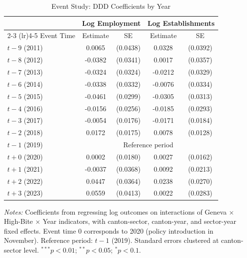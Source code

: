 \begin{table}[htbp]
\centering
\caption{Event Study: DDD Coefficients by Year}
\label{tab:event_study}
\begin{threeparttable}
\begin{tabular}{lcccc}
\toprule
 & \multicolumn{2}{c}{Log Employment} & \multicolumn{2}{c}{Log Establishments} \\
\cmidrule(lr){2-3} \cmidrule(lr){4-5}
Event Time & Estimate & SE & Estimate & SE \\
\midrule
$t-9$ (2011) & 0.0065 & (0.0438) & 0.0328 & (0.0392) \\
$t-8$ (2012) & -0.0382 & (0.0341) & 0.0017 & (0.0357) \\
$t-7$ (2013) & -0.0324 & (0.0324) & -0.0212 & (0.0329) \\
$t-6$ (2014) & -0.0338 & (0.0332) & -0.0076 & (0.0334) \\
$t-5$ (2015) & -0.0461 & (0.0299) & -0.0305 & (0.0313) \\
$t-4$ (2016) & -0.0156 & (0.0256) & -0.0185 & (0.0293) \\
$t-3$ (2017) & -0.0054 & (0.0176) & -0.0171 & (0.0184) \\
$t-2$ (2018) & 0.0172 & (0.0175) & 0.0078 & (0.0128) \\
$t-1$ (2019) & \multicolumn{4}{c}{Reference period} \\
\midrule
$t+0$ (2020) & 0.0002 & (0.0180) & 0.0027 & (0.0162) \\
$t+1$ (2021) & -0.0037 & (0.0368) & 0.0092 & (0.0213) \\
$t+2$ (2022) & 0.0447 & (0.0364) & 0.0238 & (0.0270) \\
$t+3$ (2023) & 0.0559 & (0.0413) & 0.0022 & (0.0283) \\
\bottomrule
\end{tabular}
\begin{tablenotes}[flushleft]
\small
\item \textit{Notes:} Coefficients from regressing log outcomes on interactions of
Geneva $\times$ High-Bite $\times$ Year indicators, with canton-sector, canton-year,
and sector-year fixed effects. Event time 0 corresponds to 2020 (policy introduction in
November). Reference period: $t-1$ (2019). Standard errors clustered at canton-sector level.
$^{***}p<0.01$; $^{**}p<0.05$; $^{*}p<0.1$.
\end{tablenotes}
\end{threeparttable}
\end{table}
